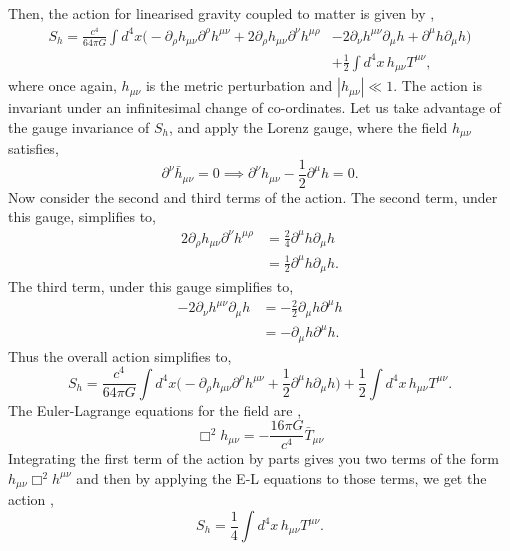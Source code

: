 \documentclass[12pt,a4paper]{report}
\theoremstyle{plain}
\theoremstyle{definition}
\theoremstyle{remark}
\newcommand{\munu}{\mu\nu}
\begin{document}
Then, the action for linearised gravity coupled to matter is given by \cite{gravact1, carroll_2019},
\begin{equation}
\begin{aligned}
	S_{h} = \frac{c^4}{64 \pi G} \int d^4 x \Big(-\partial_{\rho} h_{\mu \nu} \partial^{\rho} h^{\mu \nu} + 2 \partial_{\rho} h_{\mu \nu} \partial^{\nu} h^{\mu \rho} 
	&- 2 \partial_{\nu} h^{\mu \nu} \partial_{\mu} h + \partial^{\mu} h \partial_{\mu} h \Big) \\
	&+ \frac{1}{2} \int d^4 x \,h_{\mu \nu} T^{\mu \nu},
\end{aligned}
\end{equation}
where once again, $h_{\munu}$ is the metric perturbation and $|h_{\munu}| \ll 1$. The action is invariant under an infinitesimal change of co-ordinates. Let us take advantage of the gauge invariance of $S_h$, and apply the Lorenz gauge, where the field $h_{\munu}$ satisfies,
\begin{equation}
    \partial^{\nu}\bar{h}_{\munu} = 0 \implies \partial^{\nu}h_{\munu} - \frac{1}{2}\partial^{\mu}h = 0.
\end{equation}
Now consider the second and third terms of the action. The second term, under this gauge, simplifies to,
\begin{equation}
    \begin{aligned}
        2 \partial_{\rho} h_{\mu \nu} \partial^{\nu} h^{\mu \rho} &= \frac{2}{4} \partial^{\mu}h\partial_{\mu}h \\
        &= \frac{1}{2} \partial^{\mu}h\partial_{\mu}h.
    \end{aligned}
\end{equation}
The third term, under this gauge simplifies to,
\begin{equation}
    \begin{aligned}
        - 2 \partial_{\nu} h^{\mu \nu} \partial_{\mu} h &= -\frac{2}{2}\partial_{\mu}h\partial^{\mu}h\\
        &= -\partial_{\mu}h\partial^{\mu}h.
    \end{aligned}
\end{equation}
Thus the overall action simplifies to,
\begin{equation}
	S_{h} = \frac{c^4}{64 \pi G} \int d^4 x \Big(-\partial_{\rho} h_{\mu \nu} \partial^{\rho} h^{\mu \nu} + \frac{1}{2} \partial^{\mu}h\partial_{\mu}h \Big)  + \frac{1}{2} \int d^4 x \,h_{\mu \nu} T^{\mu \nu}.
\end{equation}
The Euler-Lagrange equations for the field are \cite{weinberg, Flanagan_2005, poisson_will_2014},
\begin{equation}
    \Box^2h_{\munu} = -\frac{16\pi G}{c^4}\bar{T}_{\munu}
\end{equation}
Integrating the first term of the action by parts gives you two terms of the form $h_{\munu}\Box^2h^{\munu}$ and then by applying the E-L equations to those terms, we get the action \cite{Christodoulou_2023b},
\begin{equation} \label{eq: CovarAct}
    S_h =  \frac{1}{4} \int d^4x \,h_{\mu \nu} T^{\mu \nu}.
\end{equation}
\end{document}
